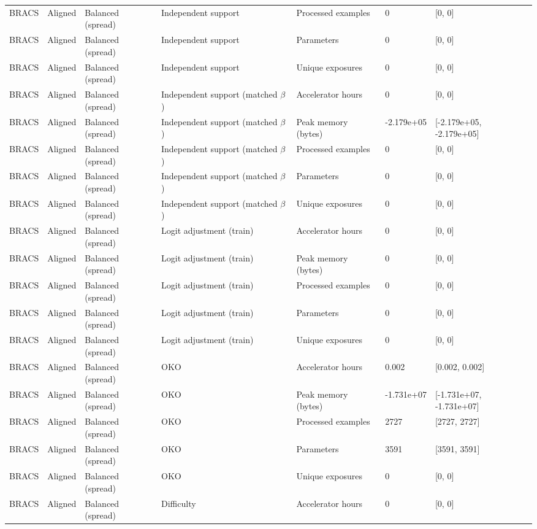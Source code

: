 \begin{longtable}{lllllll}
BRACS & Aligned & Balanced (spread) & Independent support & Processed examples & 0 & [0, 0] \\
BRACS & Aligned & Balanced (spread) & Independent support & Parameters & 0 & [0, 0] \\
BRACS & Aligned & Balanced (spread) & Independent support & Unique exposures & 0 & [0, 0] \\
BRACS & Aligned & Balanced (spread) & Independent support (matched $\beta$) & Accelerator hours & 0 & [0, 0] \\
BRACS & Aligned & Balanced (spread) & Independent support (matched $\beta$) & Peak memory (bytes) & -2.179e+05 & [-2.179e+05, -2.179e+05] \\
BRACS & Aligned & Balanced (spread) & Independent support (matched $\beta$) & Processed examples & 0 & [0, 0] \\
BRACS & Aligned & Balanced (spread) & Independent support (matched $\beta$) & Parameters & 0 & [0, 0] \\
BRACS & Aligned & Balanced (spread) & Independent support (matched $\beta$) & Unique exposures & 0 & [0, 0] \\
BRACS & Aligned & Balanced (spread) & Logit adjustment (train) & Accelerator hours & 0 & [0, 0] \\
BRACS & Aligned & Balanced (spread) & Logit adjustment (train) & Peak memory (bytes) & 0 & [0, 0] \\
BRACS & Aligned & Balanced (spread) & Logit adjustment (train) & Processed examples & 0 & [0, 0] \\
BRACS & Aligned & Balanced (spread) & Logit adjustment (train) & Parameters & 0 & [0, 0] \\
BRACS & Aligned & Balanced (spread) & Logit adjustment (train) & Unique exposures & 0 & [0, 0] \\
BRACS & Aligned & Balanced (spread) & OKO & Accelerator hours & 0.002 & [0.002, 0.002] \\
BRACS & Aligned & Balanced (spread) & OKO & Peak memory (bytes) & -1.731e+07 & [-1.731e+07, -1.731e+07] \\
BRACS & Aligned & Balanced (spread) & OKO & Processed examples & 2727 & [2727, 2727] \\
BRACS & Aligned & Balanced (spread) & OKO & Parameters & 3591 & [3591, 3591] \\
BRACS & Aligned & Balanced (spread) & OKO & Unique exposures & 0 & [0, 0] \\
BRACS & Aligned & Balanced (spread) & Difficulty & Accelerator hours & 0 & [0, 0] \\

\end{longtable}
